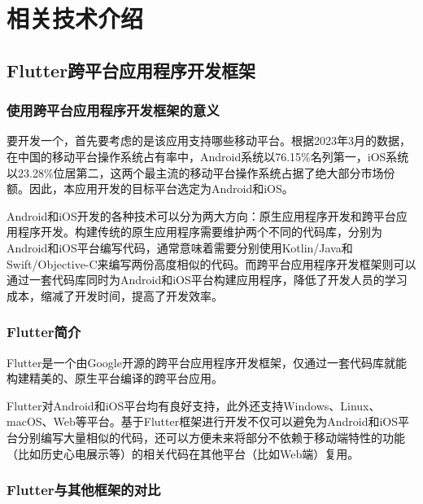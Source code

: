 

\chapter{相关技术介绍}\label{ch:tech}


\section{Flutter跨平台应用程序开发框架}\label{sec:flutter}

\subsection{使用跨平台应用程序开发框架的意义}\label{subsec:why-framework}

要开发一个\app ，首先要考虑的是该应用支持哪些移动平台。根据2023年3月的数据\cite{MobileOperatingSystem}，在中国的移动平台操作系统占有率中，Android系统以76.15\%名列第一，iOS系统以23.28\%位居第二，这两个最主流的移动平台操作系统占据了绝大部分市场份额。因此，本应用开发的目标平台选定为Android和iOS。

Android和iOS开发的各种技术可以分为两大方向：原生应用程序开发和跨平台应用程序开发。构建传统的原生应用程序需要维护两个不同的代码库，分别为Android和iOS平台编写代码，通常意味着需要分别使用Kotlin/Java和Swift/Objective-C来编写两份高度相似的代码。而跨平台应用程序开发框架则可以通过一套代码库同时为Android和iOS平台构建应用程序，降低了开发人员的学习成本，缩减了开发时间，提高了开发效率。

\subsection{Flutter简介}\label{subsec:flutter}

Flutter是一个由Google开源的跨平台应用程序开发框架，仅通过一套代码库就能构建精美的、原生平台编译的跨平台应用\cite{FlutterBuildApps}。

Flutter对Android和iOS平台均有良好支持，此外还支持Windows、Linux、macOS、Web等平台\cite{SupportedDeploymentPlatforms}。基于Flutter框架进行开发不仅可以避免为Android和iOS平台分别编写大量相似的代码，还可以方便未来将部分不依赖于移动端特性的功能（比如历史心电展示等）的相关代码在其他平台（比如Web端）复用。

\subsection{Flutter与其他框架的对比}\label{subsec:flutter-compare}

